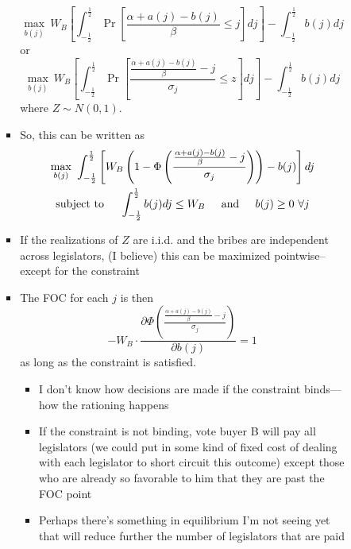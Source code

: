 \documentclass[12pt]{article}
\begin{document}
\begin{enumerate}
\begin{itemize}
\begin{itemize}
\begin{itemize}
								\begin{equation}
									\max_{b(j)} \ W_B \left[ \int_{-\frac{1}{2}}^\frac{1}{2} \Pr \left[\frac{\alpha + a(j) - b(j)}{\beta} \leq j \right] dj \right] - \int_{-\frac{1}{2}}^\frac{1}{2} b(j) dj
								\end{equation}
								or
								\begin{equation}
									\max_{b(j)} \ W_B \left[ \int_{-\frac{1}{2}}^\frac{1}{2} \Pr \left[\frac{\frac{\alpha + a(j) - b(j)}{\beta} - j}{\sigma_j} \leq z \right] dj \right] - \int_{-\frac{1}{2}}^\frac{1}{2} b(j) dj
								\end{equation}
								where $Z \sim N(0,1)$. \\
							\item	So, this can be written as
								\begin{multline}
									\max_{b(j)} \ \int_{-\frac{1}{2}}^\frac{1}{2} \left[ W_B \left(1- \Phi \left(\frac{\frac{\alpha + a(j) - b(j)}{\beta} - j}{\sigma_j} \right)\right) - b(j) \right] dj \\
									\text{subject to} \hskip.2in \int_{-\frac{1}{2}}^\frac{1}{2} b(j) dj \leq W_B  \hskip.2in \text{and} \hskip.2in b(j)\geq0 \ \forall j
									\label{ex:objB}
								\end{multline}
							\item If the realizations of $Z$ are i.i.d. and the bribes are independent across legislators, (I believe) this can be maximized pointwise--except for the constraint
							\item The FOC for each $j$ is then
								\begin{equation}
								  - W_B \cdot \frac{ \partial \Phi \left(\frac{\frac{\alpha + a(j) - b(j)}{\beta} - j}{\sigma_j} \right)}{\partial b(j)} = 1
									\label{eq:foc}
								\end{equation}
								as long as the constraint is satisfied.
									\begin{itemize}
										\item I don't know how decisions are made if the constraint binds---how the rationing happens
										\item If the constraint is not binding, vote buyer B will pay all legislators (we could put in some kind of fixed cost of dealing with each legislator to short circuit this outcome) except those who are already so favorable to him that they are past the FOC point
										\item Perhaps there's something in equilibrium I'm not seeing yet that will reduce further the number of legislators that are paid

\end{itemize}
\end{itemize}
\end{itemize}
\end{itemize}
\end{enumerate}
\end{document}
